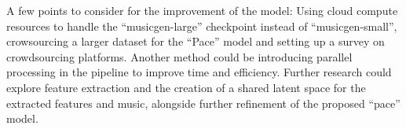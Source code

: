 \documentclass[conference]{IEEEtran}
\begin{document}
A few points to consider for the improvement of the model: Using cloud compute resources to handle the ``musicgen-large'' checkpoint instead of ``musicgen-small'', crowsourcing a larger dataset for the ``Pace'' model and setting up a survey on crowdsourcing platforms. Another method could be introducing parallel processing in the pipeline to improve time and efficiency.
Further research could explore feature extraction and the creation of a shared latent space for the extracted features and music, alongside further refinement of the proposed ``pace'' model.

\nocite{kreuk2022audiogen}
\nocite{wu2008study}
\nocite{gajarla2015emotion}
\nocite{donahue2018adversarial}



\end{document}
